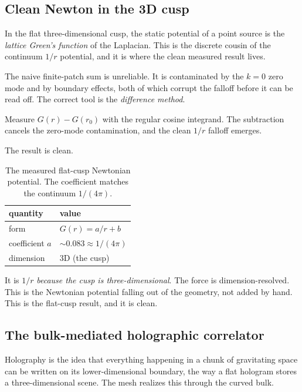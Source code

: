 \subsection{Clean Newton in the 3D cusp}

In the flat three-dimensional cusp, the static potential of a point source is the \emph{lattice Green's function} of the Laplacian. This is the discrete cousin of the continuum $1/r$ potential, and it is where the clean measured result lives.

The naive finite-patch sum is unreliable. It is contaminated by the $k=0$ zero mode and by boundary effects, both of which corrupt the falloff before it can be read off. The correct tool is the \emph{difference method}.

\begin{principle}
Measure $G(r) - G(r_0)$ with the regular cosine integrand. The subtraction cancels the zero-mode contamination, and the clean $1/r$ falloff emerges.
\end{principle}

The result is clean.

\begin{table}[ht]
\centering
\begin{tabular}{@{}ll@{}}
\toprule
quantity & value \\
\midrule
form & $G(r) = a/r + b$ \\
coefficient $a$ & $\sim 0.083 \approx 1/(4\pi)$ \\
dimension & 3D (the cusp) \\
\bottomrule
\end{tabular}
\caption{The measured flat-cusp Newtonian potential. The coefficient matches the continuum $1/(4\pi)$.}
\label{tab:newton-cusp}
\end{table}

It is $1/r$ \emph{because the cusp is three-dimensional}. The force is dimension-resolved. This is the Newtonian potential falling out of the geometry, not added by hand. This is the flat-cusp result, and it is clean.

\subsection{The bulk-mediated holographic correlator}

Holography is the idea that everything happening in a chunk of gravitating space can be written on its lower-dimensional boundary, the way a flat hologram stores a three-dimensional scene. The mesh realizes this through the curved bulk.

